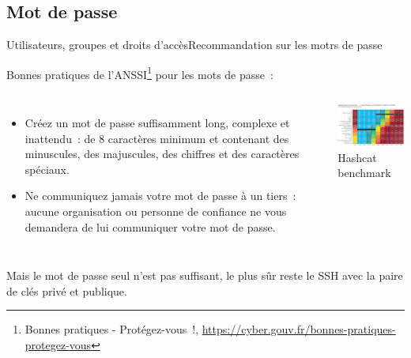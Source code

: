 \documentclass{beamer}
\begin{document}
    \subsection{Mot de passe}\label{subsec:password}
    \begin{frame}{Utilisateurs, groupes et droits d'accès}{Recommandation sur les motrs de passe}
        \begin{footnotesize}
            Bonnes pratiques de l'ANSSI\footnote{Bonnes pratiques - Protégez-vous~!, \url{https://cyber.gouv.fr/bonnes-pratiques-protegez-vous}} pour les mots de passe~:
            \begin{columns}
                \begin{itemize}
                    \item Créez un mot de passe suffisamment long, complexe et inattendu~:
                    de 8 caractères minimum et contenant des minuscules, des majuscules,
                    des chiffres et des caractères spéciaux.

                    \item Ne communiquez jamais votre mot de passe à un tiers~: aucune
                    organisation ou personne de confiance ne vous demandera de lui
                    communiquer votre mot de passe.

                \end{itemize}
                \centering
                \includegraphics[width=6.5cm]{image/real-password-cracking} \\ Hashcat benchmark\footnotemark \\
            \end{columns}
            Mais le mot de passe seul n'est pas suffisant, le plus sûr reste le SSH avec la paire de clés privé et publique.
        \end{footnotesize}
    \end{frame}
\end{document}
